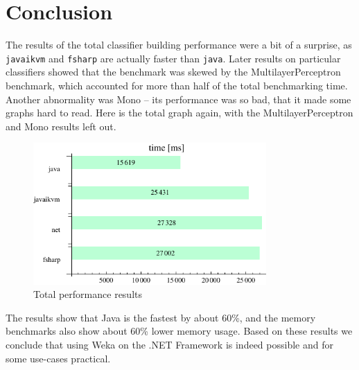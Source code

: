 \documentclass[journal]{IEEEtran/IEEEtran}
\newcommand\ver[1]{%
{\texttt{#1}}}
\begin{document}
%

\section{Conclusion}
The results of the total classifier building performance were a bit of a surprise, as \ver{javaikvm} and \ver{fsharp} are actually faster than \ver{java}. Later results on particular classifiers showed that the benchmark was skewed by the MultilayerPerceptron benchmark, which accounted for more than half of the total benchmarking time. Another abnormality was Mono -- its performance was so bad, that it made some graphs hard to read. Here is the total graph again, with the MultilayerPerceptron and Mono results left out.
\begin{figure}[H]
\centering
\includegraphics[width=3.5in]{TotalTotal}
\caption{Total performance results}
\end{figure}

The results show that Java is the fastest by about 60\%, and the memory benchmarks also show about 60\% lower memory usage. Based on these results we conclude that using Weka on the .NET Framework is indeed possible and for some use-cases practical.
\end{document}
